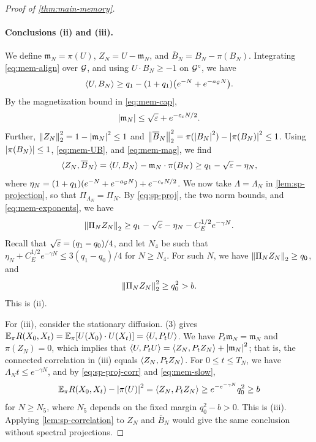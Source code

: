 \begin{proof}[Proof of \cref{thm:main-memory}]
\paragraph{Conclusions (ii) and (iii).} We define $\mathfrak m_N=\pi(U)$, $Z_N=U-\mathfrak m_N$, and $\overline B_N=B_N-\pi(B_N)$. Integrating \eqref{eq:mem-align} over $\mathcal G$, and using $U\cdot B_N\ge-1$ on $\mathcal G^c$, we have
\begin{equation}\label{eq:mem-UB}
\langle U,B_N\rangle\ge q_1-(1+q_1)\big(e^{-N}+e^{-a_\mathcal G N}\big).
\end{equation}
By the magnetization bound in \eqref{eq:mem-cap},
\begin{equation}\label{eq:mem-mag}
\left|\mathfrak m_N\right|\le\sqrt{\varepsilon}+e^{-c_\varepsilon N/2}.
\end{equation}
Further, $\left\lVert Z_N\right\rVert_2^2=1-\left|\mathfrak m_N\right|^2\le1$ and $\left\lVert\overline B_N\right\rVert_2^2=\pi(\left|B_N\right|^2)-\left|\pi(B_N)\right|^2\le1$. Using $\left|\pi(B_N)\right|\le1$, \eqref{eq:mem-UB}, and \eqref{eq:mem-mag}, we find
\[
\langle Z_N,\overline B_N\rangle=\langle U,B_N\rangle-\mathfrak m_N\cdot\pi(B_N)\ge q_1-\sqrt{\varepsilon}-\eta_N,
\]
where $\eta_N=(1+q_1)(e^{-N}+e^{-a_\mathcal G N})+e^{-c_\varepsilon N/2}$.
We now take $\Lambda=\Lambda_N$ in \cref{lem:sp-projection}, so that $\Pi_{\Lambda_N}=\Pi_N$. By \eqref{eq:sp-proj}, the two norm bounds, and \eqref{eq:mem-exponents}, we have
\[
\left\lVert\Pi_NZ_N\right\rVert_2\ge q_1-\sqrt{\varepsilon}-\eta_N-C_E^{1/2}e^{-\gamma N}.
\]
Recall that $\sqrt{\varepsilon}=(q_1-q_0)/4$, and let $N_4$ be such that $\eta_N+C_E^{1/2}e^{-\gamma N}\le3(q_1-q_0)/4$ for $N\ge N_4$. For such $N$, we have $\left\lVert\Pi_NZ_N\right\rVert_2\ge q_0$, and
\begin{equation}\label{eq:mem-slow}
\left\lVert\Pi_NZ_N\right\rVert_2^2\ge q_0^2>b.
\end{equation}
This is (ii).

For (iii), consider the stationary diffusion. (3) gives $\mathbb E_\pi R(X_0,X_t)=\mathbb E_\pi[U(X_0)\cdot U(X_t)]=\langle U,P_tU\rangle$. We have $P_t\mathfrak m_N=\mathfrak m_N$ and $\pi(Z_N)=0$, which implies that $\langle U,P_tU\rangle=\langle Z_N,P_tZ_N\rangle+\left|\mathfrak m_N\right|^2$; that is, the connected correlation in (iii) equals $\langle Z_N,P_tZ_N\rangle$. For $0\le t\le T_N$, we have $\Lambda_Nt\le e^{-\gamma N}$, and by \eqref{eq:sp-proj-corr} and \eqref{eq:mem-slow},
\[
\mathbb E_\pi R(X_0,X_t)-\left|\pi(U)\right|^2=\langle Z_N,P_tZ_N\rangle\ge e^{-e^{-\gamma N}}q_0^2\ge b
\]
for $N\ge N_5$, where $N_5$ depends on the fixed margin $q_0^2-b>0$. This is (iii). Applying \cref{lem:sp-correlation} to $Z_N$ and $\overline B_N$ would give the same conclusion without spectral projections.


\end{proof}
